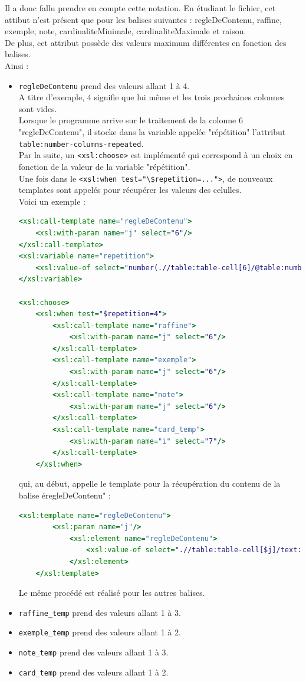 \documentclass[11pt]{report}
\begin{document}
Il a donc fallu prendre en compte cette notation. En étudiant le fichier, cet attibut n'est présent que pour les balises suivantes : regleDeContenu, raffine, exemple, note, cardinaliteMinimale, cardinaliteMaximale et raison.\\
De plus, cet attribut possède des valeurs maximum différentes en fonction des balises.\\
Ainsi :
\begin{itemize}
    \item \lstinline{regleDeContenu} prend des valeurs allant 1 à 4. \\ A titre d'exemple, 4 signifie que lui même et les trois prochaines colonnes sont vides.\\ Lorsque le programme arrive sur le traitement de la colonne 6 "regleDeContenu", il stocke dans la variable appelée "répétition" l'attribut \lstinline{table:number-columns-repeated}.\\
    Par la suite, un \lstinline{<xsl:choose>} est implémenté qui correspond à un choix en fonction de la valeur de la variable "répétition".\\
    Une fois dans le \lstinline{<xsl:when test="\$repetition=...">}, de nouveaux templates sont appelés pour récupérer les valeurs des celulles. \\
    Voici un exemple : 
    \begin{lstlisting}[language=XSLT]
<xsl:call-template name="regleDeContenu">
    <xsl:with-param name="j" select="6"/>
</xsl:call-template>
<xsl:variable name="repetition">
    <xsl:value-of select="number(.//table:table-cell[6]/@table:number-columns-repeated)"/>
</xsl:variable>

<xsl:choose>
    <xsl:when test="$repetition=4">
        <xsl:call-template name="raffine">
            <xsl:with-param name="j" select="6"/>
        </xsl:call-template>
        <xsl:call-template name="exemple">
            <xsl:with-param name="j" select="6"/>
        </xsl:call-template>
        <xsl:call-template name="note">
            <xsl:with-param name="j" select="6"/>
        </xsl:call-template>
        <xsl:call-template name="card_temp">
            <xsl:with-param name="i" select="7"/>
        </xsl:call-template>
    </xsl:when>
    \end{lstlisting}
    qui, au début, appelle le template pour la récupération du contenu de la balise éregleDeContenu" : 
    \begin{lstlisting}[language=XSLT]
    <xsl:template name="regleDeContenu">
        <xsl:param name="j"/>
            <xsl:element name="regleDeContenu">
                <xsl:value-of select=".//table:table-cell[$j]/text:p"/>
            </xsl:element>
    </xsl:template>
    \end{lstlisting}
    Le même procédé est réalisé pour les autres balises.
    \item \lstinline{raffine_temp} prend des valeurs allant 1 à 3.
    \item \lstinline{exemple_temp} prend des valeurs allant 1 à 2.
    \item \lstinline{note_temp} prend des valeurs allant 1 à 3.
    \item \lstinline{card_temp} prend des valeurs allant 1 à 2.
\end{itemize}
\end{document}

